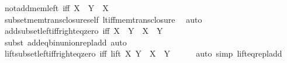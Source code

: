 \begin{isabellebody}
\ not{\isacharunderscore}{\kern0pt}add{\isacharunderscore}{\kern0pt}mem{\isacharunderscore}{\kern0pt}left\ {\isacharbrackleft}{\kern0pt}iff{\isacharbrackright}{\kern0pt}{\isacharcolon}{\kern0pt}\ {\isachardoublequoteopen}X\ {\isacharplus}{\kern0pt}\ Y\ {\isasymnotin}\ X{\isachardoublequoteclose}\isanewline
%
\isadelimproof
\ \ %
\endisadelimproof
%
\isatagproof
{}\isamarkupfalse%
\ subset{\isacharunderscore}{\kern0pt}mem{\isacharunderscore}{\kern0pt}trans{\isacharunderscore}{\kern0pt}closure{\isacharunderscore}{\kern0pt}self\ lt{\isacharunderscore}{\kern0pt}iff{\isacharunderscore}{\kern0pt}mem{\isacharunderscore}{\kern0pt}trans{\isacharunderscore}{\kern0pt}closure\ \isamarkupfalse%
\ auto%
\endisatagproof
{\isafoldproof}%
%
\isadelimproof
\isanewline
%
\endisadelimproof
\isanewline
{}\isamarkupfalse%
\ add{\isacharunderscore}{\kern0pt}subset{\isacharunderscore}{\kern0pt}left{\isacharunderscore}{\kern0pt}iff{\isacharunderscore}{\kern0pt}right{\isacharunderscore}{\kern0pt}eq{\isacharunderscore}{\kern0pt}zero\ {\isacharbrackleft}{\kern0pt}iff{\isacharbrackright}{\kern0pt}{\isacharcolon}{\kern0pt}\ {\isachardoublequoteopen}X\ {\isacharplus}{\kern0pt}\ Y\ {\isasymsubseteq}\ X\ {\isasymlongleftrightarrow}\ Y\ {\isacharequal}{\kern0pt}\ {}{\isachardoublequoteclose}\isanewline
%
\isadelimproof
\ \ %
\endisadelimproof
%
\isatagproof
{}\isamarkupfalse%
\ {\isacharparenleft}{\kern0pt}subst\ add{\isacharunderscore}{\kern0pt}eq{\isacharunderscore}{\kern0pt}bin{\isacharunderscore}{\kern0pt}union{\isacharunderscore}{\kern0pt}repl{\isacharunderscore}{\kern0pt}add{\isacharparenright}{\kern0pt}\ auto%
\endisatagproof
{\isafoldproof}%
%
\isadelimproof
\isanewline
%
\endisadelimproof
\isanewline
{}\isamarkupfalse%
\ lift{\isacharunderscore}{\kern0pt}subset{\isacharunderscore}{\kern0pt}left{\isacharunderscore}{\kern0pt}iff{\isacharunderscore}{\kern0pt}right{\isacharunderscore}{\kern0pt}eq{\isacharunderscore}{\kern0pt}zero\ {\isacharbrackleft}{\kern0pt}iff{\isacharbrackright}{\kern0pt}{\isacharcolon}{\kern0pt}\ {\isachardoublequoteopen}lift\ X\ Y\ {\isasymsubseteq}\ X\ {\isasymlongleftrightarrow}\ Y\ {\isacharequal}{\kern0pt}\ {}{\isachardoublequoteclose}\isanewline
%
\isadelimproof
\ \ %
\endisadelimproof
%
\isatagproof
{}\isamarkupfalse%
\ {\isacharparenleft}{\kern0pt}auto\ simp{\isacharcolon}{\kern0pt}\ lift{\isacharunderscore}{\kern0pt}eq{\isacharunderscore}{\kern0pt}repl{\isacharunderscore}{\kern0pt}add{\isacharparenright}{\kern0pt}%
\endisatagproof
{\isafoldproof}%

\end{isabellebody}
